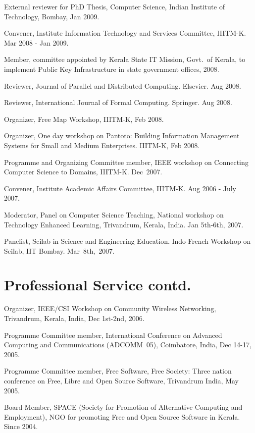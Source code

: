 \documentclass[11pt,margin,line]{res}
\begin{document}
\begin{resume}
External reviewer for PhD Thesis, Computer Science, Indian
Institute of Technology, Bombay, Jan 2009.

Convener, Institute Information Technology and Services
Committee, IIITM-K.  Mar 2008 - Jan 2009.


Member, committee appointed by Kerala State IT Mission,
Govt.~of Kerala, to implement Public Key Infrastructure in
state government offices, 2008.


Reviewer, Journal of Parallel and Distributed Computing.
Elsevier. Aug 2008.

Reviewer, International Journal of Formal Computing.
Springer. Aug 2008.

Organizer, Free Map Workshop, IIITM-K, Feb 2008. 

Organizer, One day workshop on Pantoto: Building Information
Management Systems for Small and Medium Enterprises. 
IIITM-K, Feb 2008.

Programme and Organizing Committee member, IEEE workshop on
Connecting Computer Science to Domains, IIITM-K.  Dec~2007.

Convener, Institute Academic Affairs Committee, IIITM-K.
Aug 2006 - July 2007.

Moderator, Panel on Computer Science Teaching, National
workshop on Technology Enhanced Learning, Trivandrum,
Kerala, India.  Jan 5th-6th, 2007.

Panelist, Scilab in Science and Engineering Education.
Indo-French Workshop on Scilab, IIT Bombay.  Mar~8th,~2007.

\newpage

\section{\sc Professional Service contd.}

Organizer, IEEE/CSI Workshop on Community Wireless
Networking, Trivandrum, Kerala, India, Dec 1st-2nd, 2006.

Programme Committee member, International Conference on
Advanced Computing and Communications (ADCOMM~05),
Coimbatore, India, Dec 14-17, 2005.

Programme Committee member, Free Software, Free Society: Three
nation conference on Free, Libre and Open Source Software,
Trivandrum India, May 2005.

Board Member, SPACE (Society for Promotion of Alternative
Computing and Employment), NGO for promoting Free and Open
Source Software in Kerala. Since 2004.


\end{resume}
\end{document}
